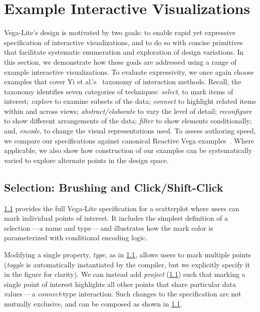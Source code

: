 \section{Example Interactive Visualizations}
\label{sec:vl:examples}

Vega-Lite's design is motivated by two goals: to enable rapid yet expressive
specification of interactive visualizations, and to do so with concise
primitives that facilitate systematic enumeration and exploration of design
variations. In this section, we demonstrate how these goals are addressed using
a range of example interactive visualizations. To evaluate expressivity, we once
again choose examples that cover Yi et al.'s~\cite{yi:understanding} taxonomy of
interaction methods. Recall, the taxonomy identifies seven categories of
techniques: \emph{select}, to mark items of interest; \emph{explore} to examine
subsets of the data; \emph{connect} to highlight related items within and across
views; \emph{abstract/elaborate} to vary the level of detail; \emph{reconfigure}
to show different arrangements of the data; \emph{filter} to show elements
conditionally; and, \emph{encode}, to change the visual representations used. To
assess authoring speed, we compare our specifications against canonical Reactive
Vega examples~\cite{reactive-vega-arch, reactive-vega-model, vega:editor}. Where
applicable, we also show how construction of our examples can be systematically
varied to explore alternate points in the design space.

\subsection{Selection: Brushing and Click/Shift-Click}

\cref{} provides the full Vega-Lite specification for a
scatterplot where users can mark individual points of interest. It includes the
simplest definition of a selection\,---\,a name and type\,---\,and illustrates
how the mark color is parameterized with conditional encoding logic.

Modifying a single property, \emph{type}, as in
\cref{}, allows users to mark multiple points
(\emph{toggle} is automatically instantiated by the compiler, but we explicitly
specify it in the figure for clarity). We can instead add \emph{project}
(\cref{}) such that marking a single point of interest
highlights all other points that share particular data values\,---\,a
\emph{connect}-type interaction. Such changes to the specification are not
mutually exclusive, and can be composed as shown in
\cref{}.

